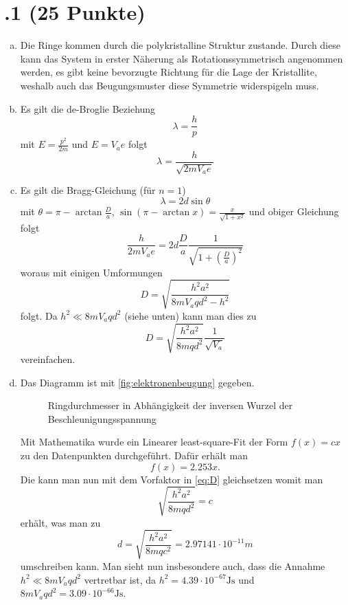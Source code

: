 \section*{\nr.1 \titone (25 Punkte)}
\begin{enumerate}[(a)]
\item Die Ringe kommen durch die polykristalline Struktur zustande. Durch diese kann das System in erster Näherung als Rotationssymmetrisch angenommen werden, es gibt keine bevorzugte Richtung für die Lage der Kristallite, weshalb auch das Beugungsmuster diese Symmetrie widerspigeln muss.
\item Es gilt die de-Broglie Beziehung
\begin{equation}
  \lambda = \frac{h}{p}
\end{equation}
mit $E=\frac{p^2}{2m}$ und $E=V_ae$ folgt
\begin{equation}
  \lambda = \frac{h}{\sqrt{2m V_a e}}
\end{equation}
\item Es gilt die Bragg-Gleichung (für $n=1$)
\begin{equation}
  \lambda=2d\sin{\theta}
\end{equation}
mit $\theta = \pi-\arctan \frac{D}{a}$, $\sin(\pi-\arctan x)=\frac{x}{\sqrt{1+x^2}}$ und obiger Gleichung folgt 
\begin{equation}
  \frac{h}{2mV_a e}=2d \frac{D}{a}\frac{1}{\sqrt{1+\left(\frac{D}{a}\right)^2}}
\end{equation}
woraus mit einigen Umformungen 
\begin{equation}
  D=\sqrt{\frac{h^2a^2}{8mV_a qd^2-h^2}}
\end{equation}
folgt. Da $h^2\ll8mV_a qd^2$ (siehe unten) kann man dies zu
\begin{equation}
   D=\sqrt{\frac{h^2a^2}{8m qd^2}}\frac{1}{\sqrt{V_a}}
\label{eq:D}
\end{equation}
vereinfachen.
\item Das Diagramm ist mit \vref{fig:elektronenbeugung} gegeben.
\begin{figure}[htbp]
\centering

\caption{Ringdurchmesser in Abhängigkeit der inversen Wurzel der Beschleunigungsspannung}
\label{fig:elektronenbeugung}
\end{figure}
Mit Mathematika wurde ein Linearer least-square-Fit der Form $f(x)=cx$ zu den Datenpunkten durchgeführt. Dafür erhält man
\begin{equation}
  f(x)= 2.253 x.
\end{equation}
Die kann man nun mit dem Vorfaktor in \vref{eq:D} gleichsetzen womit man
\begin{equation}
  \sqrt{\frac{h^2a^2}{8m qd^2}} = c 
\end{equation}
erhält, was man zu 
\begin{equation}
  d=\sqrt{\frac{h^2a^2}{8m qc^2}}=2.97141\cdot 10^{-11} m
\end{equation}
umschreiben kann. Man sieht nun insbesondere auch, dass die Annahme $h^2\ll8mV_a qd^2$ vertretbar ist, da $h^2=4.39\cdot10^{-67} \mathrm{Js}$ und $8mV_a qd^2=3.09\cdot10^{-66} \mathrm{Js}$.
\end{enumerate}

